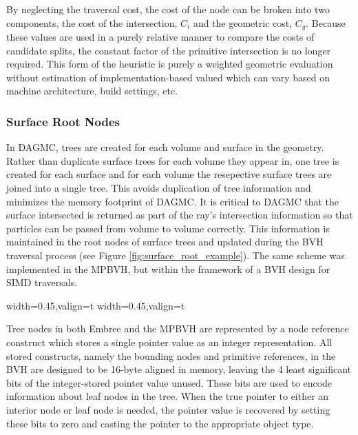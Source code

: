 By neglecting the traversal cost, the cost of the node can be broken into two
components, the cost of the intersection, $C_{i}$ and the geometric cost,
$C_{g}$. Because these values are used in a purely relative manner to compare
the costs of candidate splits, the constant factor of the primitive intersection
is no longer required. This form of the heuristic is purely a weighted geometric
evaluation without estimation of implementation-based valued which can vary
based on machine architecture, build settings, etc.

\subsubsection{Surface Root Nodes}

In DAGMC, trees are created for each volume and surface in the geometry. Rather
than duplicate surface trees for each volume they appear in, one tree is created
for each surface and for each volume the resepective surface trees are joined
into a single tree. This avoids duplication of tree information and minimizes
the memory footprint of DAGMC. It is critical to DAGMC that the surface
intersected is returned as part of the ray's intersection information so that
particles can be passed from volume to volume correctly. This information is
maintained in the root nodes of surface trees and updated during the BVH
traversal process (see Figure \ref{fig:surface_root_example}). The same
scheme was implemented in the MPBVH, but within the framework of a BVH design
for SIMD traversals.

\begin{sidewaysfigure}
  \centering
  {width=0.45\textwidth,valign=t}
  {width=0.45\textwidth,valign=t}
  \caption{Left: Representation of a faceted DAGMC geometry. Right: The
    corresponding BVH structure for that volume. Surface subtrees are shared
    between volumes to avoid duplicate data.}
  \label{fig:surface_root_example}
\end{sidewaysfigure}

Tree nodes in both Embree and the MPBVH are represented by a node
reference construct which stores a single pointer value as an integer
representation. All stored constructs, namely the bounding nodes and primitive
references, in the BVH are designed to be 16-byte aligned in memory, leaving the
4 least significant bits of the integer-stored pointer value unused. These bits
are used to encode information about leaf nodes in the tree. When the true
pointer to either an interior node or leaf node is needed, the pointer value is
recovered by setting these bits to zero and casting the pointer to the
appropriate object type.

